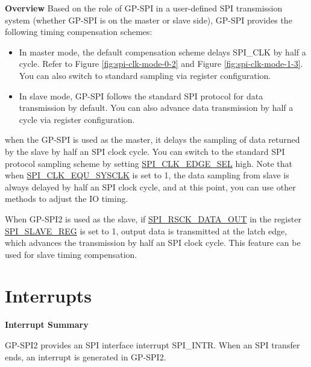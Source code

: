 \documentclass[main\_\_EN.tex]{subfiles}
\begin{document}
\textbf{Overview}
Based on the role of GP-SPI in a user-defined SPI transmission system (whether GP-SPI is on the master or slave side), GP-SPI provides the following timing compensation schemes:
\begin{itemize}
    \item In master mode, the default compensation scheme delays SPI\_CLK by half a cycle. Refer to Figure \ref{fig:spi-clk-mode-0-2} and Figure \ref{fig:spi-clk-mode-1-3}. You can also switch to standard sampling via register configuration.
    \item In slave mode, GP-SPI follows the standard SPI protocol for data transmission by default. You can also advance data transmission by half a cycle via register configuration.
\end{itemize}

when the GP-SPI is used as the master, it delays the sampling of data returned by the slave by half an SPI clock cycle. You can switch to the standard SPI protocol sampling scheme by setting \hyperref[fielddesc:SPICLKEDGESEL]{SPI\_CLK\_EDGE\_SEL} high. Note that when \hyperref[fielddesc:SPICLKEQUSYSCLK]{SPI\_CLK\_EQU\_SYSCLK} is set to 1, the data sampling from slave is always delayed by half an SPI clock cycle, and at this point, you can use other methods to adjust the IO timing.

When GP-SPI2 is used as the slave, if \hyperref[fielddesc:SPIRSCKDATAOUT]{SPI\_RSCK\_DATA\_OUT} in the register \hyperref[regdesc:SPISLAVEREG]{SPI\_SLAVE\_REG} is set to 1, output data is transmitted at the latch edge, which advances the transmission by half an SPI clock cycle. This feature can be used for slave timing compensation.

\section{Interrupts} \label{sec:spi-interrupt}

\textbf{Interrupt Summary}

GP-SPI2 provides an SPI interface interrupt SPI\_INTR. When an SPI transfer ends, an interrupt is generated in GP-SPI2.
\end{document}
